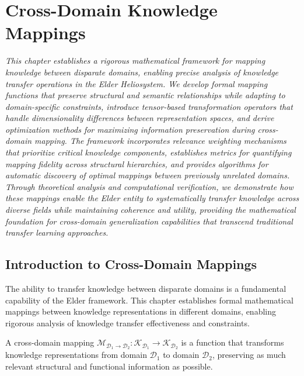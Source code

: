 \chapter{Cross-Domain Knowledge Mappings}

\textit{This chapter establishes a rigorous mathematical framework for mapping knowledge between disparate domains, enabling precise analysis of knowledge transfer operations in the Elder Heliosystem. We develop formal mapping functions that preserve structural and semantic relationships while adapting to domain-specific constraints, introduce tensor-based transformation operators that handle dimensionality differences between representation spaces, and derive optimization methods for maximizing information preservation during cross-domain mapping. The framework incorporates relevance weighting mechanisms that prioritize critical knowledge components, establishes metrics for quantifying mapping fidelity across structural hierarchies, and provides algorithms for automatic discovery of optimal mappings between previously unrelated domains. Through theoretical analysis and computational verification, we demonstrate how these mappings enable the Elder entity to systematically transfer knowledge across diverse fields while maintaining coherence and utility, providing the mathematical foundation for cross-domain generalization capabilities that transcend traditional transfer learning approaches.}

\section{Introduction to Cross-Domain Mappings}

The ability to transfer knowledge between disparate domains is a fundamental capability of the Elder framework. This chapter establishes formal mathematical mappings between knowledge representations in different domains, enabling rigorous analysis of knowledge transfer effectiveness and constraints.

\begin{definition}
A cross-domain mapping $\mathcal{M}_{\mathcal{D}_1 \rightarrow \mathcal{D}_2}: \mathcal{K}_{\mathcal{D}_1} \rightarrow \mathcal{K}_{\mathcal{D}_2}$ is a function that transforms knowledge representations from domain $\mathcal{D}_1$ to domain $\mathcal{D}_2$, preserving as much relevant structural and functional information as possible.
\end{definition}

